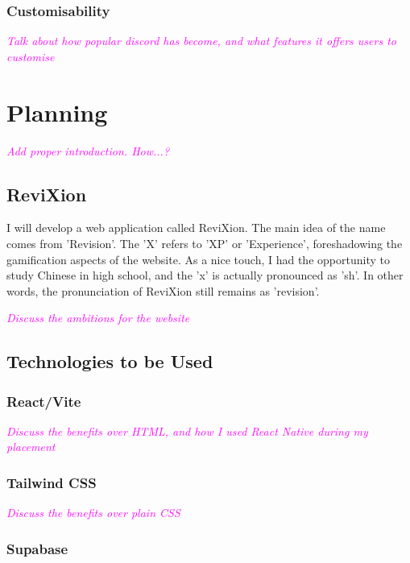 \documentclass{report}
\begin{document}
\subsection{Customisability}

\textcolor{magenta}{\textit{Talk about how popular discord has become, and what features it offers users to customise}}



\chapter{Planning}

\textcolor{magenta}{\textit{Add proper introduction. How...?}}

\section{ReviXion}

I will develop a web application called ReviXion.
The main idea of the name comes from 'Revision'.
The 'X' refers to 'XP' or 'Experience', foreshadowing the gamification aspects of the website.
As a nice touch, I had the opportunity to study Chinese in high school, and the 'x' is actually pronounced as 'sh'.
In other words, the pronunciation of ReviXion still remains as 'revision'.

\textcolor{magenta}{\textit{Discuss the ambitions for the website}}

\section{Technologies to be Used}

\subsection{React/Vite}

\textcolor{magenta}{\textit{Discuss the benefits over HTML, and how I used React Native during my placement}}

\subsection{Tailwind CSS}

\textcolor{magenta}{\textit{Discuss the benefits over plain CSS}}

\subsection{Supabase}
\end{document}
